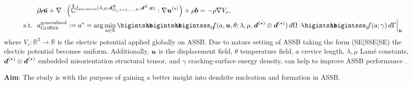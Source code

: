 \documentclass[25pt, a0paper,
portrait,
margin=2mm, 
innermargin=2mm, 
blockverticalspace=7mm, %
colspace=2mm, %
subcolspace=0mm]{tikzposter}
\makeatletter
\newcommand*{\inputfig}[3][htb]{{
    \def\fps@figure{#1}
    \def\DIR{#2}
    \def\LABEL{#3}
    \graphicspath{{\DIR/}}
    
}}
\makeatother
\begin{document}
{\begin{minipage}{0.56\textwidth}
\begin{mdframed}
			\begin{align}
				 & 
				\cancel{\partial_{t}\bm{u}}
				+
				\nabla \cdot
				\Big(
				\accentset{\scriptstyle 4}{\mathbb{C}}^{f_{\text{alocation}}(\lambda,\mu,\Bd^{R}_{G_i, i=1,\dots,N},\Bd^{E};\Bx)}
				:\nabla\Bu^{(s)}
				\Big)
				+ \rho\Bb
				= -\rho\nabla V_{e}, \\
				\text{s.t.}\ \
				 & 
				a_{\text{Griffith}}^{\text{generalised}} := a^{*}
				= \arg\min_{a\in\mathbb{R}}
				{
					\bigintsss\!\!\!\!\!\!\bigintsss\!\!\!\!\!\!\bigintsss_{\Omega}
					\!\!
					f(a,\bm{u},\theta;\lambda,\mu,\bm{d}^{(\star)}\otimes\bm{d}^{(\star)}) \, d\Omega
					- 
					\!\!\!\!
					\bigintsss\!\!\!\!\!\!\bigintsss_{\Gamma}
					\!\!
					f(a;\gamma) \, d\Gamma
				}
				\Big|_{\bar{\bm{u}}}
			\end{align}
			where $V_{e}: \mathbb{R}^{3}\to\mathbb{R}$
			is the electric potential applied globally on ASSB.
			Due to nature setting of ASSB taking the form 
			(SE|SSE|SE)
			the electric potential becomes uniform.
			Additionally,
			${\boldsymbol{\mathnormal u}}$ is the displacement field, 
			$\theta$ temperature field, 
			$a$ crevice length,
			$\lambda, \mu$ Lam\'{e} constants,
			${\boldsymbol{\mathnormal d}}^{(\star)}\otimes{\boldsymbol{\mathnormal d}}^{(\star)}$ embedded misorientation structural tensor,
			and 
			$\gamma$ cracking-surface energy density,
			can help 
			to improve ASSB performance \cite{vo2023_obms23}\cite{vo2023_cse23}.
		\end{mdframed}
		\vspace{-2mm}
		\begin{mdframed}
			\textbf{Aim}: 
			The study is with the purpose of 
			gaining a better insight into dendrite nucleation and formation in ASSB.
		\end{mdframed}
	\end{minipage}%
	\hfill
	\begin{minipage}{0.44\textwidth}
		\begin{center}
			\inputfig{floats/routine_woTV_spectral_boschcolor}{routine_woTV_spectral_boschcolor}
			\inputfig{floats/dendrite_SESSE}{dendrite_SESSE}
		\end{center}
	\end{minipage}
	\vspace{-0.3cm}
}
\end{document}
